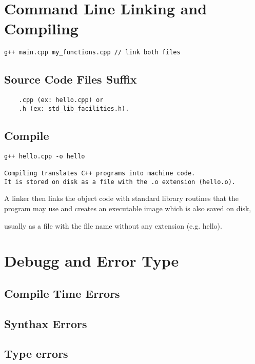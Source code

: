 \section{Command Line Linking and Compiling}

\begin{verbatim}
g++ main.cpp my_functions.cpp // link both files
\end{verbatim}

\subsection{Source Code Files Suffix}

\begin{verbatim}
    .cpp (ex: hello.cpp) or
    .h (ex: std_lib_facilities.h).
\end{verbatim}

\subsection{Compile}
\begin{verbatim}
g++ hello.cpp -o hello

Compiling translates C++ programs into machine code.
It is stored on disk as a file with the .o extension (hello.o). 
\end{verbatim}

A linker then links the object code with standard library routines that the program may use and creates an executable image which is also saved on disk,

usually as a file with the file name without any extension (e.g. hello).

\section{Debugg and Error Type}

\subsection{Compile Time Errors}

\subsection{Synthax Errors}

\subsection{Type errors}

